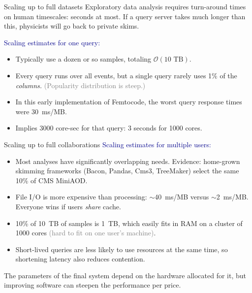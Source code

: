 \documentclass{beamer}
\begin{document}
\begin{frame}{Scaling up to full datasets}
Exploratory data analysis requires turn-around times on human timescales: seconds at most. If a query server takes much longer than this, physicists will go back to private skims.

\vfill
\textcolor{darkblue}{Scaling estimates for one query:}
\begin{itemize}
\item Typically use a dozen or so samples, totaling $\mathcal{O}(\mbox{10~TB})$.
\item Every query runs over all events, but a single query rarely uses 1\% of the {\it columns.} \textcolor{gray}{(Popularity distribution is steep.)}
\item In this early implementation of Femtocode, the worst query response times were 30~ms/MB.
\item Implies 3000 core-sec for that query: 3 seconds for 1000 cores.
\end{itemize}
\end{frame}

\begin{frame}{Scaling up to full collaborations}
\vspace{0.4 cm}
\textcolor{darkblue}{Scaling estimates for multiple users:}
\begin{itemize}
\item Most analyses have significantly overlapping needs. Evidence: home-grown skimming frameworks (Bacon, Pandas, Cms3, TreeMaker) select the same 10\% of CMS MiniAOD.
\item File I/O is more expensive than processing: $\sim$40~ms/MB versus $\sim$2~ms/MB. Everyone wins if users {\it share} cache.
\item 10\% of 10~TB of samples is 1~TB, which easily fits in RAM on a cluster of 1000 cores \textcolor{gray}{(hard to fit on one user's machine)}.
\item Short-lived queries are less likely to use resources at the same time, so shortening latency also reduces contention.
\end{itemize}

\vfill
The parameters of the final system depend on the hardware allocated for it, but improving software can steepen the performance per price.
\end{frame}
\end{document}
